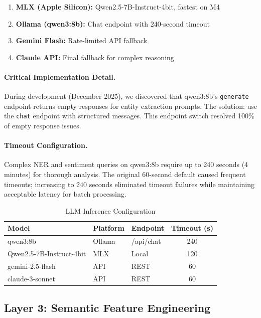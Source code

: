\begin{enumerate}[itemsep=2pt,parsep=0pt]
    \item \textbf{MLX (Apple Silicon):} Qwen2.5-7B-Instruct-4bit, fastest on M4
    \item \textbf{Ollama (qwen3:8b):} Chat endpoint with 240-second timeout
    \item \textbf{Gemini Flash:} Rate-limited API fallback
    \item \textbf{Claude API:} Final fallback for complex reasoning
\end{enumerate}

\paragraph{Critical Implementation Detail.}
During development (December 2025), we discovered that qwen3:8b's \texttt{generate} endpoint returns empty responses for entity extraction prompts. The solution: use the \texttt{chat} endpoint with structured messages. This endpoint switch resolved 100\% of empty response issues.

\paragraph{Timeout Configuration.}
Complex NER and sentiment queries on qwen3:8b require up to 240 seconds (4 minutes) for thorough analysis. The original 60-second default caused frequent timeouts; increasing to 240 seconds eliminated timeout failures while maintaining acceptable latency for batch processing.

\begin{table}[htbp]
\centering
\caption{LLM Inference Configuration}
\label{tab:llm-config}
\small
\begin{tabular}{@{} l l l S[table-format=3.0] @{}}
\toprule
\textbf{Model} & \textbf{Platform} & \textbf{Endpoint} & \textbf{Timeout (s)} \\
\midrule
qwen3:8b & Ollama & /api/chat & 240 \\
Qwen2.5-7B-Instruct-4bit & MLX & Local & 120 \\
gemini-2.5-flash & API & REST & 60 \\
claude-3-sonnet & API & REST & 60 \\
\bottomrule
\end{tabular}
\end{table}

\subsection{Layer 3: Semantic Feature Engineering}

